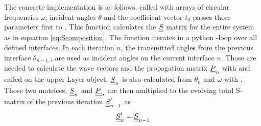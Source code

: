 The concrete implementation is as follows.  called with
arrays of circular frequencies $\omega$, incident angles $\theta$ and the
coefficient vector $t_0$ passes those parameters first to
. This function calculates the $\underline{\underline{S}}$
matrix for the entire system as in equation \ref{eq:Scomposition}. The function
iterates in a python -loop over all defined interfaces. In each
iteration $n$, the transmitted angles from the previous interface
$\theta_{n-1,i}$
are used as incident angles on the current interface $n$. Those are needed to
calculate the wave vectors and the propagation matrix $\underline{\underline{P}}_n$ with
 and  called on the upper Layer object.
$\underline{\underline{S}}_n$ is also calculated from $\theta_n$ and $\omega$ with
. Those two matrices, $\underline{\underline{S}}_n$ and $\underline{\underline{P}}_n$
are then multiplied to the evolving total S-matrix of the previous iteration 
$\underline{\underline{S}}_{n-1}^\prime$ as
\begin{equation}
    \underline{\underline{S}}_n^\prime = \underline{\underline{S}}_{n-1}
\end{equation}


